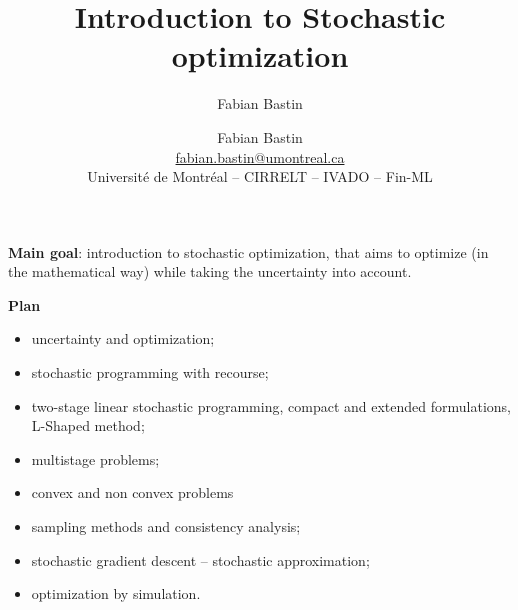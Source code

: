 \documentclass{beamer}
\title[Plan]{Introduction to Stochastic optimization}
\author{Fabian Bastin}
\author[Fabian Bastin]{Fabian Bastin \\ \url{fabian.bastin@umontreal.ca} \\ Université de Montréal -- CIRRELT -- IVADO -- Fin-ML}
\date{}
\begin{document}
\frame{\titlepage}

\begin{frame}


{\bf Main goal}: introduction to stochastic optimization, that aims to optimize (in the mathematical way) while taking the uncertainty into account.

\mbox{}

{\bf Plan}
\begin{itemize}
\item
uncertainty and optimization;
\item
stochastic programming with recourse;
\item
two-stage linear stochastic programming, compact and extended formulations, L-Shaped method;
\item
multistage problems;
\item
convex and non convex problems
\item
sampling methods and consistency analysis;
\item
stochastic gradient descent -- stochastic approximation;
\item
optimization by simulation.
\end{itemize}

\end{frame}
\end{document}

